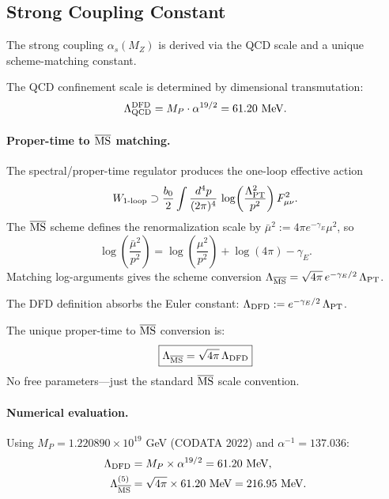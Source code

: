 \subsection{Strong Coupling Constant}\label{app:alpha-s}

The strong coupling $\alpha_s(M_Z)$ is derived via the QCD scale and a unique
scheme-matching constant.

\begin{theorem}\label{thm:lambda-qcd}
The QCD confinement scale is determined by dimensional transmutation:
\begin{equation}
\Lambda_{\rm QCD}^{\rm DFD} = M_P \cdot \alpha^{19/2} = 61.20~\text{MeV}.
\end{equation}
\end{theorem}

\paragraph{Proper-time to $\overline{\rm MS}$ matching.}
The spectral/proper-time regulator produces the one-loop effective action
\[
W_{1\text{-loop}} \supset \frac{b_0}{2} \int \frac{d^4p}{(2\pi)^4}\, 
\log\!\left(\frac{\Lambda_{\rm PT}^2}{p^2}\right) F_{\mu\nu}^2.
\]
The $\overline{\rm MS}$ scheme defines the renormalization scale by
$\bar{\mu}^2 := 4\pi e^{-\gamma_E} \mu^2$, so
\[
\log\!\left(\frac{\bar{\mu}^2}{p^2}\right) = \log\!\left(\frac{\mu^2}{p^2}\right) 
+ \log(4\pi) - \gamma_E.
\]
Matching log-arguments gives the scheme conversion
$\Lambda_{\overline{\rm MS}} = \sqrt{4\pi}\, e^{-\gamma_E/2}\, \Lambda_{\rm PT}$.

The DFD definition absorbs the Euler constant:
$\Lambda_{\rm DFD} := e^{-\gamma_E/2}\, \Lambda_{\rm PT}$.

\begin{lemma}\label{lem:scheme-match}
The unique proper-time to $\overline{\rm MS}$ conversion is:
\begin{equation}
\boxed{\Lambda_{\overline{\rm MS}} = \sqrt{4\pi}\, \Lambda_{\rm DFD}}
\end{equation}
No free parameters---just the standard $\overline{\rm MS}$ scale convention.
\end{lemma}

\paragraph{Numerical evaluation.}
Using $M_P = 1.220890 \times 10^{19}$ GeV (CODATA 2022) and $\alpha^{-1} = 137.036$:
\begin{align}
\Lambda_{\rm DFD} &= M_P \times \alpha^{19/2} = 61.20~\text{MeV}, \\
\Lambda_{\overline{\rm MS}}^{(5)} &= \sqrt{4\pi} \times 61.20~\text{MeV} = 216.95~\text{MeV}.
\end{align}

